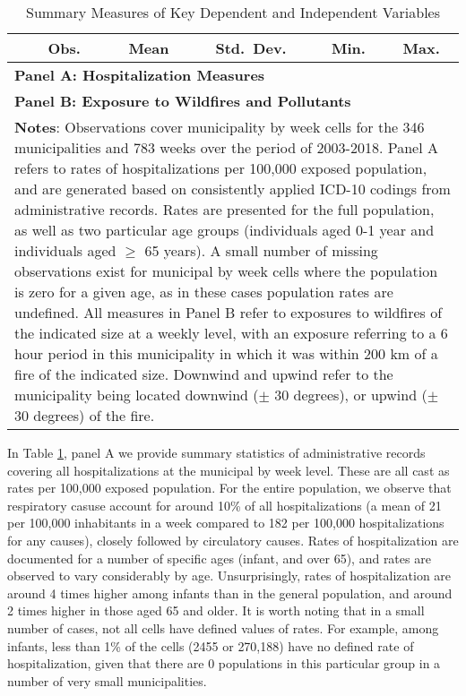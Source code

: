 \documentclass[11pt]{article}
\begin{document}
\begin{spacing}{1.3}
\begin{table}[htpb!]
    \centering
    \caption{Summary Measures of Key Dependent and Independent Variables}
    \label{tab:sumstats}
    \begin{tabular}{lccccc} \toprule
    & Obs.\ & Mean & Std.\ Dev. & Min. & Max. \\ \midrule
    \multicolumn{6}{l}{\textbf{Panel A: Hospitalization Measures}}\\
    
    \multicolumn{6}{l}{\textbf{Panel B: Exposure to Wildfires and Pollutants}} \\
     
     
     \midrule
    \multicolumn{6}{p{16.4cm}}{\footnotesize \textbf{Notes}: Observations cover municipality by week cells for the 346 municipalities and 783 weeks over the period of 2003-2018.
    Panel A refers to rates of hospitalizations per 100,000 exposed population, and are generated based on consistently applied ICD-10 codings from administrative records.  Rates are presented for the full population, as well as two particular age groups (individuals aged 0-1 year and individuals aged $\geq$ 65 years). A small number of missing observations exist for municipal by week cells where the population is zero for a given age, as in these cases population rates are undefined.
    All measures in Panel B refer to exposures to wildfires of the indicated size at a weekly level, with an exposure referring to a 6 hour period in this municipality in which it was within 200 km of a fire of the indicated size.  Downwind and upwind refer to the municipality being located downwind ($\pm$ 30 degrees), or upwind ($\pm$ 30 degrees) of the fire.  }\\  \bottomrule
    \end{tabular}
\end{table}

In Table \ref{tab:sumstats}, panel A we provide summary statistics of administrative records covering all hospitalizations at the municipal by week level. These are all cast as rates per 100,000 exposed population.  For the entire population, we observe that respiratory casuse account for around 10\% of all hospitalizations (a mean of 21 per 100,000 inhabitants in a week compared to 182 per 100,000 hospitalizations for any causes), closely followed by circulatory causes.  Rates of hospitalization are documented for a number of specific ages (infant, and over 65), and rates are observed to vary considerably by age.  Unsurprisingly, rates of hospitalization are around 4 times higher among infants than in the general population, and around 2 times higher in those aged 65 and older.  It is worth noting that in a small number of cases, not all cells have defined values of rates.  For example, among infants, less than 1\% of the cells (2455 or 270,188) have no defined rate of hospitalization, given that there are 0 populations in this particular group in a number of very small municipalities.


\end{spacing}
\end{document}
